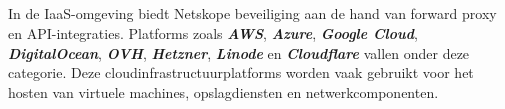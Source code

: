     
    
    
    
    

\subsection{}
\label{subsubsec:iaas-poc}

In de IaaS-omgeving biedt Netskope beveiliging aan de hand van forward proxy en API-integraties. 
Platforms zoals \textbf{\textit{AWS}}, \textbf{\textit{Azure}}, \textbf{\textit{Google Cloud}}, \textbf{\textit{DigitalOcean}}, \textbf{\textit{OVH}}, \textbf{\textit{Hetzner}}, \textbf{\textit{Linode}} 
en \textbf{\textit{Cloudflare}} vallen onder deze categorie. Deze cloudinfrastructuurplatforms worden vaak gebruikt voor het hosten van virtuele machines, opslagdiensten en netwerkcomponenten.





